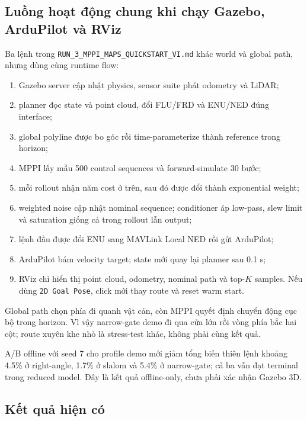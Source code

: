 \documentclass[10pt,a4paper]{article}
\newcommand{\code}[1]{\texttt{#1}}
\begin{document}
\subsection{Luồng hoạt động chung khi chạy Gazebo, ArduPilot và RViz}

Ba lệnh trong \code{RUN\_3\_MPPI\_MAPS\_QUICKSTART\_VI.md} khác world và global
path, nhưng dùng cùng runtime flow:
\begin{enumerate}
  \item Gazebo server cập nhật physics, sensor suite phát odometry và LiDAR;
  \item planner đọc state và point cloud, đổi FLU/FRD và ENU/NED đúng interface;
  \item global polyline được bo góc rồi time-parameterize thành reference trong horizon;
  \item MPPI lấy mẫu 500 control sequences và forward-simulate 30 bước;
  \item mỗi rollout nhận năm cost ở trên, sau đó được đổi thành exponential weight;
  \item weighted noise cập nhật nominal sequence; conditioner áp low-pass, slew
  limit và saturation giống cả trong rollout lẫn output;
  \item lệnh đầu được đổi ENU sang MAVLink Local NED rồi gửi ArduPilot;
  \item ArduPilot bám velocity target; state mới quay lại planner sau 0.1 s;
  \item RViz chỉ hiển thị point cloud, odometry, nominal path và top-$K$ samples.
  Nếu dùng \code{2D Goal Pose}, click mới thay route và reset warm start.
\end{enumerate}

Global path chọn phía đi quanh vật cản, còn MPPI quyết định chuyển động cục bộ
trong horizon. Vì vậy narrow-gate demo đi qua cửa lớn rồi vòng phía bắc hai cột;
route xuyên khe nhỏ là stress-test khác, không phải cùng kết quả.

A/B offline với seed 7 cho profile demo mới giảm tổng biến thiên lệnh khoảng
4.5\% ở right-angle, 1.7\% ở slalom và 5.4\% ở narrow-gate; cả ba vẫn đạt
terminal trong reduced model. Đây là kết quả offline-only, chưa phải xác nhận
Gazebo 3D.

\subsection{Kết quả hiện có}
\end{document}
